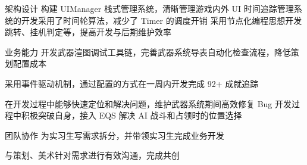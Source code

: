 

\begin{cvskills}

    \cvskill
        {架构设计} %
        {构建 ​​UIManager 栈式管理系统​​，清晰管理游戏内外 UI} %
    \cvskill
        {} %
        {时间追踪管理系统的开发采用了时间轮算法，减少了 Timer 的调度开销} %
    \cvskill
        {} %
        {采用节点化编程思想开发跳转、挂机判定等，提高开发与后期维护效率} %

    \cvskill
        {​业务能力} %
        {开发武器渲图调试工具链，完善武器系统导表自动化检查流程，降低策划配置成本} %

    \cvskill
        {} %
        {采用事件驱动机制，通过配置的方式在一周内开发完成 92+ 成就追踪} %

    \cvskill
        {} %
        {在开发过程中能够快速定位和解决问题，维护武器系统期间高效修复 Bug} %
    \cvskill
        {} %
        {开发过程中积极突破自身，接入 EQS 解决 AI 战斗和占领时的位置选择} %


    \cvskill
        {团队协作} %
        {为实习生写需求拆分，并带领实习生完成业务开发} %

    \cvskill
        {} %
        {与策划、美术针对需求进行有效沟通，完成共创} %


\end{cvskills}
